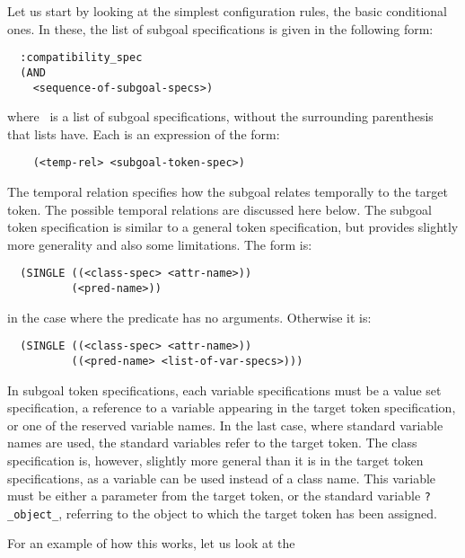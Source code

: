 Let us start by looking at the simplest configuration rules, the basic 
conditional ones.  In these, the list of subgoal specifications is 
given in the following form:
  \begin{verbatim}
  :compatibility_spec
  (AND
    <sequence-of-subgoal-specs>) \end{verbatim}
  where {\tt <sequence-of-subgoal-specs>}\ is a list of subgoal
specifications, without the surrounding parenthesis that lists have.
Each {\tt <subgoal-spec>} is an expression of the form:
  \begin{verbatim}
    (<temp-rel> <subgoal-token-spec>)
\end{verbatim}
  The temporal relation specifies how the subgoal relates temporally
to the target token.  The possible temporal relations are discussed
here below.  The subgoal token specification is similar to a general
token specification, but provides slightly more generality and also
some limitations.  The form is:
  \begin{verbatim}
  (SINGLE ((<class-spec> <attr-name>)) 
          (<pred-name>)) \end{verbatim}
  in the case where the predicate has no arguments.  Otherwise it is: 
  \begin{verbatim}
  (SINGLE ((<class-spec> <attr-name>))
          ((<pred-name> <list-of-var-specs>))) \end{verbatim}
  
In subgoal token specifications, each variable specifications must be
a value set specification, a reference to a variable appearing in the
target token specification, or one of the reserved variable names.  In
the last case, where standard variable names are used, the standard
variables refer to the target token.  The class specification is,
however, slightly more general than it is in the target token
specifications, as a variable can be used instead of a class name. 
This variable must be either a parameter from the target token, or the
standard variable {\tt ?\_object\_}, referring to the object to which
the target token has been assigned.

For an example of how this works, let us look at the 










